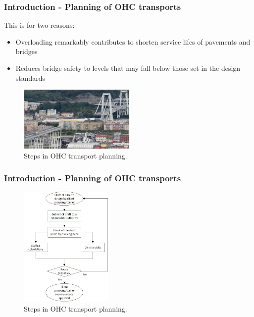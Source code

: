 \documentclass{beamer}   %
\newcommand{\RNum}[1]{\uppercase\expandafter{\romannumeral #1\relax}}
\theoremstyle{break}
\begin{document}
  \begin{frame}
    \frametitle{Introduction \RNum{4} - Planning of OHC transports}
This is for two reasons:
\begin{itemize}
 	\item Overloading remarkably contributes to shorten service lifes of pavements and bridges
	\item Reduces bridge safety to levels that may fall below those set in the design standards \cite{fiorillo2018fragility}
    \end{itemize}
 \begin{figure}[!ht]
      \centering
      \includegraphics[width=0.5\textwidth]{../manuscript/figures/Collaps.jpg}
      \caption{Steps in OHC transport planning.}
      \label{fig:higher level}
    \end{figure}  
 \end{frame}


  \begin{frame}
    \frametitle{Introduction \RNum{4} - Planning of OHC transports}
 \begin{figure}[!ht]
      \centering
      \includegraphics[width=0.4\textwidth]{../manuscript/figures/OHC Planning.jpg}
      \caption{Steps in OHC transport planning.}
      \label{fig:higher level}
    \end{figure}  
 \end{frame}
\end{document}
